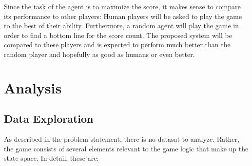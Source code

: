 \documentclass[a4paper,10pt]{article}
\begin{document}
Since the task of the agent is to maximize the score, it makes sense to compare its performance to other players:
Human players will be asked to play the game to the best of their ability.
Furthermore, a random agent will play the game in order to find a bottom line for the score count.
The proposed system will be compared to these players and is expected to perform much better than the random player and hopefully as good as humans or even better.
\section{Analysis}

\subsection{Data Exploration}

As described in the problem statement, there is no datasat to analyze.
Rather, the game consists of several elements relevant to the game logic that make up the state space.
In detail, these are:
\end{document}
